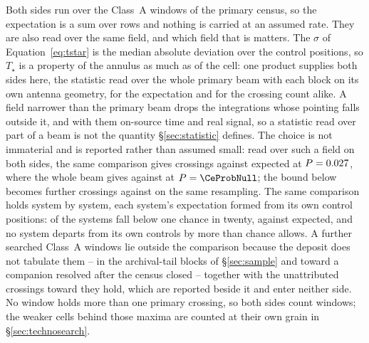Both sides run over the \CeNWin{} Class~A windows of the primary census, so
the expectation is a sum over rows and nothing is carried at an assumed rate.
They are also read over the same field, and which field that is matters.
The $\sigma$ of Equation~\ref{eq:tstar} is the median absolute deviation over
the control positions, so $T_\star$ is a property of the annulus as much as of
the cell: one product supplies both sides here, the statistic read over the
whole primary beam with each block on its own antenna geometry, for the
expectation and for the crossing count alike. A field narrower than the
primary beam drops the integrations whose pointing falls outside it, and with
them on-source time and real signal, so a statistic read over part of a beam
is not the quantity \S\ref{sec:statistic} defines. The choice is not
immaterial and is reported rather than assumed small: read over such a field
on both sides, the same comparison gives \FrNarrowObs{} crossings against
\FrNarrowExp{} expected at $P=0.027$, where the whole beam gives
\CeObs{} against \CeExp{} at $P=\CeProbNull$; the bound below becomes
\FrNarrowAddLim{} further crossings against \CeAddLim{} on the same
resampling. The same comparison holds system by system, each system's
expectation formed from its own control positions: \MtNSysLowP{} of the
\MtNSysChance{} systems fall below one chance in twenty, against
\MtNSysLowPExp{} expected, and no system departs from its own controls by
more than chance allows.
A further \CeNWinTail{} searched Class~A windows lie outside the comparison
because the deposit does not tabulate them -- \VnTailNWinA{} in the
archival-tail blocks of \S\ref{sec:sample} and \VnCompNWinA{} toward a
companion resolved after the census closed -- together with the
\CeNTailCrossWord{} unattributed crossings toward \CeTailStar{} they hold,
which are reported beside it and enter neither side. No window holds more than one primary crossing, so
both sides count windows; the weaker cells behind those maxima are counted at
their own grain in \S\ref{sec:technosearch}.

